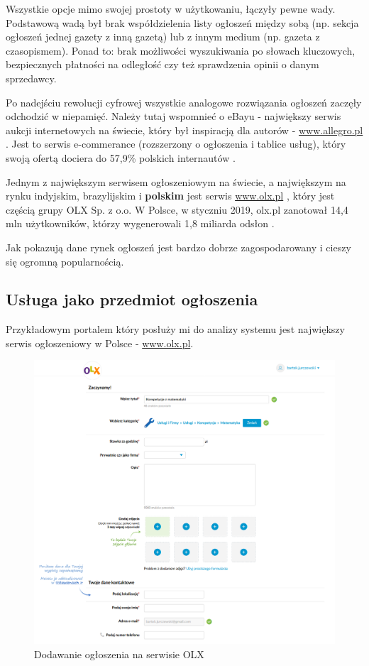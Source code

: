 \documentclass[12pt]{article}
\numberwithin{figure}{section}
\begin{document}
\begin{sloppypar}
Wszystkie opcje mimo swojej prostoty w użytkowaniu, łączyły pewne wady. Podstawową wadą był brak współdzielenia listy ogłoszeń między sobą (np. sekcja ogłoszeń jednej gazety z inną gazetą) lub z innym medium (np. gazeta z czasopismem). Ponad to: brak możliwości wyszukiwania po słowach kluczowych, bezpiecznych płatności na odległość czy też sprawdzenia opinii o danym sprzedawcy.

Po nadejściu rewolucji cyfrowej wszystkie analogowe rozwiązania ogłoszeń zaczęły odchodzić w niepamięć. Należy tutaj wspomnieć o eBayu - największy serwis aukcji internetowych na świecie, który był inspiracją dla autorów - \url{www.allegro.pl} \cite{allegro-wywiad}. Jest to serwis e-commerance (rozszerzony o ogłoszenia i tablice usług), który swoją ofertą dociera do 57,9\% polskich internautów \cite{allegro-liczby}. 

Jednym z największym serwisem ogłoszeniowym na świecie, a największym na rynku indyjskim, brazylijskim i \textbf{polskim} jest serwis \url{www.olx.pl} \cite{olx-wywiad}, który jest częścią grupy OLX Sp. z o.o. W Polsce, w styczniu 2019, olx.pl zanotował 14,4 mln użytkowników, którzy wygenerowali 1,8 miliarda odsłon \cite{olx-liczby}.

Jak pokazują dane rynek ogłoszeń jest bardzo dobrze zagospodarowany i cieszy się ogromną popularnością.
\subsection{Usługa jako przedmiot ogłoszenia}
Przykładowym portalem który posłuży mi do analizy systemu jest największy serwis ogłoszeniowy w Polsce - \url{www.olx.pl}.

    \begin{figure}[H]
    	\centering
    	\includegraphics[width=.8\textwidth]{images/chapter_2/olx-add-announcement.png}
    	\caption{Dodawanie ogłoszenia na serwisie OLX}
    	\label{fig:olx-add-announcement}
    \end{figure}


\end{sloppypar}
\end{document}
